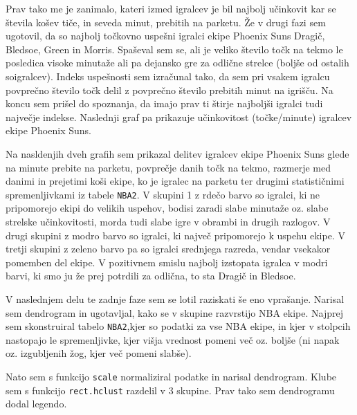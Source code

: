 \documentclass[11pt,a4paper]{article}
\begin{document}
\medskip

Prav tako me je zanimalo, kateri izmed igralcev je bil najbolj učinkovit kar se števila košev tiče, in seveda minut, prebitih na parketu. Že v drugi fazi sem ugotovil, da so najbolj točkovno uspešni igralci ekipe Phoenix Suns Dragič, Bledsoe, Green in Morris. Spaševal sem se, ali je veliko število točk na tekmo le posledica visoke minutaže ali pa dejansko gre za odlične strelce (boljše od ostalih soigralcev). Indeks uspešnosti sem izračunal tako, da sem pri vsakem igralcu povprečno število točk delil z povprečno število prebitih minut na igrišču. Na koncu sem prišel do spoznanja, da imajo prav ti štirje najboljši igralci tudi največje indekse. Naslednji graf pa prikazuje učinkovitost (točke/minute) igralcev ekipe Phoenix Suns.
\medskip


Na nasldenjih dveh grafih sem prikazal delitev igralcev ekipe Phoenix Suns glede na minute prebite na parketu, povprečje danih točk na tekmo, razmerje med danimi in prejetimi koši ekipe, ko je igralec na parketu ter drugimi statističnimi spremenljivkami iz tabele \verb|NBA2|. V skupini 1 z rdečo barvo so igralci, ki ne pripomorejo ekipi do velikih uspehov, bodisi zaradi slabe minutaže oz. slabe strelske učinkovitosti, morda tudi slabe igre v obrambi in drugih razlogov. V drugi skupini z modro barvo so igralci, ki največ pripomorejo k uspehu ekipe. V tretji skupini z zeleno barvo pa so igralci srednjega razreda, vendar vsekakor pomemben del ekipe. V pozitivnem smislu najbolj izstopata igralca v modri barvi, ki smo ju že prej potrdili za odlična, to sta Dragič in Bledsoe.



\newpage
V naslednjem delu te zadnje faze sem se lotil raziskati še eno vprašanje. Narisal sem dendrogram in ugotavljal, kako se v skupine razvrstijo NBA ekipe. Najprej sem skonstruiral tabelo \verb|NBA2|,kjer so podatki za vse NBA ekipe,
in kjer v stolpcih nastopajo le spremenljivke, kjer višja vrednost pomeni več oz. boljše (ni napak oz. izgubljenih žog, kjer več pomeni slabše).
\medskip

Nato sem s funkcijo \verb|scale| normaliziral podatke in narisal dendrogram.
Klube sem s funkcijo \verb|rect.hclust| razdelil v 3 skupine. Prav tako sem dendrogramu dodal legendo.
\smallskip
\end{document}
